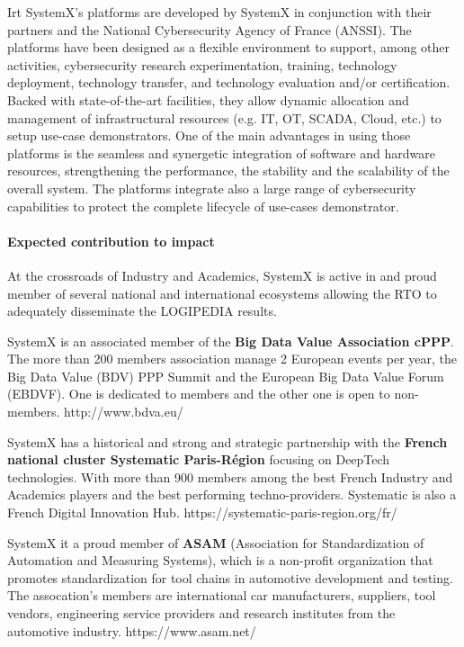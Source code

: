 \begin{sitedescription}{Irt}
SystemX’s platforms are developed by SystemX in conjunction with their partners and the National Cybersecurity Agency of France (ANSSI). The platforms have been designed as a flexible environment to support, among other activities, cybersecurity research experimentation, training, technology deployment, technology transfer, and technology evaluation and/or certification.  Backed with state-of-the-art facilities, they allow dynamic allocation and management of infrastructural resources (e.g. IT, OT, SCADA, Cloud, etc.) to setup use-case demonstrators. One of the main advantages in using those platforms is the seamless and synergetic integration of software and hardware resources, strengthening the performance, the stability and the scalability of the overall system. The platforms integrate also a large range of cybersecurity capabilities to protect the complete lifecycle of use-cases demonstrator.





\paragraph{Expected contribution to impact}
At the crossroads of Industry and Academics, SystemX is active in and proud member of several national and international ecosystems allowing the RTO to adequately disseminate the LOGIPEDIA results.

SystemX is an associated member of the {\bf Big Data Value Association cPPP}. The more than 200 members association manage 2 European events per year, the Big Data Value (BDV) PPP Summit and the European Big Data Value Forum (EBDVF). One is dedicated to members and the other one is open to non-members. http://www.bdva.eu/

SystemX has a historical and strong and strategic partnership with the {\bf French national cluster Systematic Paris-Région} focusing on DeepTech technologies. With more than 900 members among the best French Industry and Academics players and the best performing techno-providers. Systematic is also a French Digital Innovation Hub. https://systematic-paris-region.org/fr/

SystemX it a proud member of {\bf ASAM} (Association for Standardization of Automation and Measuring Systems), which is a non-profit organization that promotes standardization for tool chains in automotive development and testing. The assocation’s members are international car manufacturers, suppliers, tool vendors, engineering service providers and research institutes from the automotive industry. https://www.asam.net/


\end{sitedescription}
